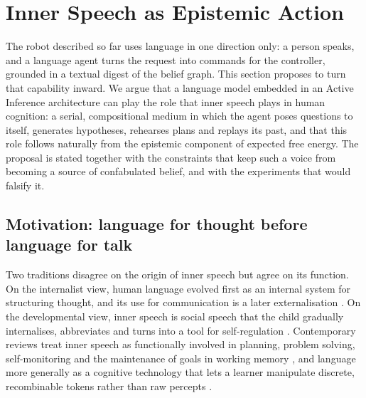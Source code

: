 %
%     

\section{Inner Speech as Epistemic Action}
\label{sec:inner_speech}

The robot described so far uses language in one direction only: a person speaks, and a language agent turns
the request into commands for the controller, grounded in a textual digest of the belief graph. This section
proposes to turn that capability inward. We argue that a language model embedded in an Active Inference
architecture can play the role that inner speech plays in human cognition: a serial, compositional medium in
which the agent poses questions to itself, generates hypotheses, rehearses plans and replays its past, and that
this role follows naturally from the epistemic component of expected free energy. The proposal is stated
together with the constraints that keep such a voice from becoming a source of confabulated belief, and with the
experiments that would falsify it.

\subsection{Motivation: language for thought before language for talk}
\label{sec:inner_speech:motivation}

Two traditions disagree on the origin of inner speech but agree on its function. On the internalist view,
human language evolved first as an internal system for structuring thought, and its use for communication is a
later externalisation \cite{berwick2016why}. On the developmental view, inner speech is social speech that the
child gradually internalises, abbreviates and turns into a tool for self-regulation \cite{vygotsky1986thought}.
Contemporary reviews treat inner speech as functionally involved in planning, problem solving, self-monitoring and
the maintenance of goals in working memory \cite{aldersonday2015inner}, and language more generally as a
cognitive technology that lets a learner manipulate discrete, recombinable tokens rather than raw percepts
\cite{clark1998magic}.

